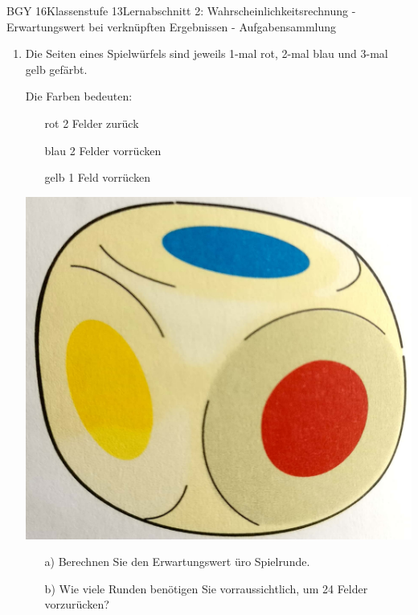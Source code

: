 \documentclass[oneside,openany,headings=optiontotoc,11pt,numbers=noenddot]{scrreprt}
\begin{document}
	\begin{worksheet}{BGY 16}{Klassenstufe 13}{Lernabschnitt 2: Wahrscheinlichkeitsrechnung - Erwartungswert bei verknüpften Ergebnissen - Aufgabensammlung}
		\noindent
		\sffamily
		\begin{framed}
			\begin{enumerate}
				\item Die Seiten eines Spielwürfels sind jeweils 1-mal rot, 2-mal blau und 3-mal gelb gefärbt.\\
				\par\noindent
				\begin{minipage}{0.5\textwidth}
					Die Farben bedeuten:
					\begin{itemize}
						\item[rot ] 2 Felder zurück
						\item[blau] 2 Felder vorrücken
						\item[gelb] 1 Feld vorrücken\\
					\end{itemize}
				\end{minipage}
				\begin{minipage}{0.15\textwidth}
					\includegraphics[width=1.1\textwidth,align=t]{../99_Bilder/04_WKR/AS1.jpg}
				\end{minipage}
				\begin{itemize}
					\item[a)] Berechnen Sie den Erwartungswert üro Spielrunde.
					\item[b)] Wie viele Runden benötigen Sie vorraussichtlich, um 24 Felder vorzurücken?

\end{itemize}
\end{enumerate}
\end{framed}
\end{worksheet}
\end{document}
